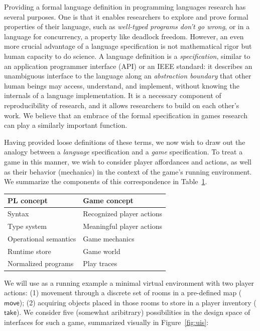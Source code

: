   Providing a formal language definition in programming languages research
  has several purposes. One is that it enables researchers to explore
  and prove formal properties of their language, such as {\em well-typed
  programs don't go wrong}, or in a language for concurrency, a property
  like deadlock freedom. However, an even more crucial advantage of a
  language specification is not mathematical rigor but human capacity to do
  science. A language definition is a {\em specification}, similar to an
  application programmer interface (API) or an IEEE standard: it describes
  an unambiguous interface to the language along an {\em abstraction
  boundary} that other human beings may access, understand, and implement,
  without knowing the internals of a language implementation.  It is a
  necessary component of reproducibility of research, and it allows
  researchers to build on each other's work. We believe that an embrace of
  the formal specification in games research can play a similarly important
  function.

  Having provided loose definitions of these terms, we now wish to draw out
  the analogy between a {\em language} specification and a {\em game}
  specification. To treat a game in this manner, we wish to consider player
  affordances and actions, as well as their behavior (mechanics) in the
  context of the game's running environment. We summarize the components of
  this correspondence in Table~\ref{tab:correspondence}.

  \begin{table}
  \begin{tabular}{ll}
    PL concept & Game concept\\
    \hline
    Syntax & Recognized player actions \\
    Type system & Meaningful player actions \\
    Operational semantics & Game mechanics \\
    Runtime store & Game world \\
    Normalized programs & Play traces 
  \end{tabular}
  \label{tab:correspondence}
  \end{table}

  \newcommand{\cmove}{\mathsf{move}}
  \newcommand{\ctake}{\mathsf{take}}

  We will use as a running example a minimal virtual environment with two
  player actions: (1) movement through a discrete set of rooms in a
  pre-defined map ($\cmove$); (2) acquiring objects placed in those rooms to store in
  a player inventory ($\ctake$).  We consider five (somewhat aribitrary)
  possibilities in the design space of interfaces for such a game,
  summarized visually in Figure~\ref{fig:uis}:

